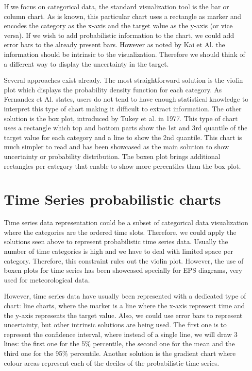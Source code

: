 \documentclass[a4paper,3p,sort&compress]{elsarticle}
\begin{document}
If we focus on categorical data, the standard visualization tool is the bar or
column chart. As is known, this particular chart uses a rectangle as marker and
encodes the category as the x-axis and the target value as the y-axis (or vice
versa). If we wish to add probabilistic information to the chart, we could add
error bars to the already present bars. However as noted by Kai et Al. the
information should be intrinsic to the visualization. Therefore we should think
of a different way to display the uncertainty in the target.

Several approaches exist already. The most straightforward solution is the
violin plot  which displays the probability density function for each
category. As Fernandez et Al. states, users do not tend to have enough
statistical knowledge to interpret this type of chart making it difficult to
extract information. The other solution is the box plot, introduced by Tukey et
al. in 1977. This type of chart uses a rectangle which top and bottom parts show
the 1st and 3rd quantile of the target value for each category and a line to
show the 2nd quantile. This chart is much simpler to read and has been showcased
as the main solution to show uncertainty or probability distribution. The boxen
plot brings additional rectangles per category that enable to show more
percentiles than the box plot.

\section{Time Series probabilistic charts}
\label{sec:time_series}

Time series data representation could be a subset of categorical data visualization where the categories are the ordered time slots. 
Therefore, we could apply the solutions seen above to represent probabilistic time series data. Usually the number of time categories
is high and we have to deal with limited space per category. Therefore, this constraint rules out the violin plot. However, the use of boxen plots for time series has been showcased specially for EPS diagrams, very used for meteorological data.

However, time series data have usually been represented with a dedicated type of chart: line charts, where the marker is a 
line where the x-axis represent time and the y-axis represents the target value. Also, we could use error bars to represent uncertainty,
but other intrinsic solutions are being used. The first one is to represent the confidence interval, where instead of a single line, we 
will draw 3 lines: the first one for the 5\% percentile, the second one for the mean and the third one for the 95\% percentile. 
Another solution is the gradient chart where colour areas represent each of the
deciles of the probabilistic time series.
\end{document}
